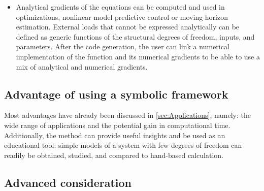 \documentclass[wes, manuscript]{copernicus}
\begin{document}
\begin{itemize}
\item Analytical gradients of the equations can be computed and used in optimizations,
nonlinear model predictive control or moving horizon estimation.
    External loads that cannot be expressed analytically can be defined as generic functions of the structural degrees of freedom, inputs, and parameters.
    After the code generation, the user can link a numerical implementation of the function and its numerical gradients to be able to use a mix of analytical and numerical gradients.
\end{itemize}


\subsection{Advantage of using a symbolic framework}
\label{sec:Advantages}
Most advantages have already been discussed in \autoref{sec:Applications}, namely: the wide range of applications and the potential gain in computational time.
Additionally, the method can provide useful insights and be used as an educational tool: simple models of a system with few degrees of freedom can readily be obtained, studied, and compared to hand-based calculation.


\subsection{Advanced consideration}
\label{sec:AdvancedConsiderations}
\end{document}
